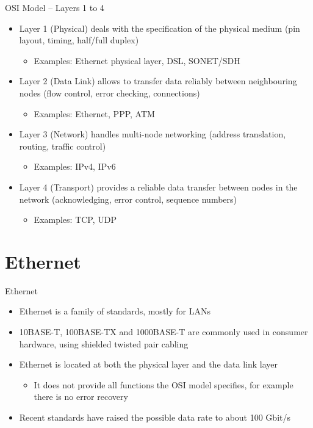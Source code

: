 \documentclass{beamer}
\begin{document}
\begin{frame}{OSI Model – Layers 1 to 4}
\begin{itemize}
	\item Layer 1 (Physical) deals with the specification of the physical medium (pin layout, timing, half/full duplex)
	\begin{itemize}
		\item Examples: Ethernet physical layer, DSL, SONET/SDH
	\end{itemize}
	\item Layer 2 (Data Link) allows to transfer data reliably between neighbouring nodes (flow control, error checking, connections)
	\begin{itemize}
		\item Examples: Ethernet, PPP, ATM
	\end{itemize}
	\item Layer 3 (Network) handles multi-node networking (address translation, routing, traffic control)
	\begin{itemize}
		\item Examples: IPv4, IPv6
	\end{itemize}
	\item Layer 4 (Transport) provides a reliable data transfer between nodes in the network (acknowledging, error control, sequence numbers)
	\begin{itemize}
		\item Examples: TCP, UDP
	\end{itemize}
\end{itemize}
\end{frame}

\section{Ethernet}

\begin{frame}{Ethernet}
\begin{itemize}
	\item Ethernet is a family of standards, mostly for LANs
	\item 10BASE-T, 100BASE-TX and 1000BASE-T are commonly used in consumer hardware, using shielded twisted pair cabling
	\item Ethernet is located at both the physical layer and the data link layer
	\begin{itemize}
		\item It does not provide all functions the OSI model specifies, for example there is no error recovery
	\end{itemize}
	\item Recent standards have raised the possible data rate to about 100 Gbit/s
\end{itemize}
\end{frame}
\end{document}
